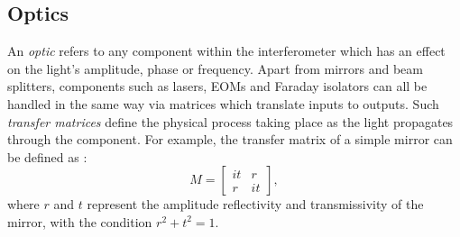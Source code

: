 \subsection{Optics}
An \emph{optic} refers to any component within the interferometer which has an effect on the light's amplitude, phase or frequency. Apart from mirrors and beam splitters, components such as lasers, \glspl{EOM} and Faraday isolators can all be handled in the same way via matrices which translate inputs to outputs. Such \emph{transfer matrices} define the physical process taking place as the light propagates through the component. For example, the transfer matrix of a simple mirror can be defined as \cite{Freise2010}:
\begin{equation}
  M =
  \begin{bmatrix}
    it & r \\
    r & it
  \end{bmatrix},
\end{equation}
where $r$ and $t$ represent the amplitude reflectivity and transmissivity of the mirror, with the condition $r^2 + t^2 = 1$.

